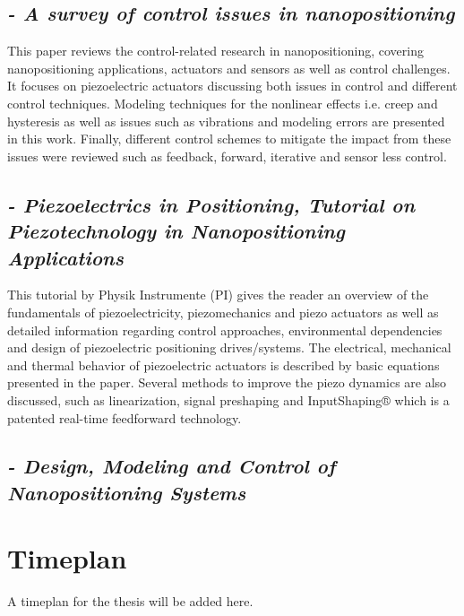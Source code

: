 \subsection*{\citep*{SurveyOfControlIssues:2007} {\small \emph{- A survey of control issues in nanopositioning}} }
This paper reviews the control-related research in nanopositioning, covering nanopositioning applications, actuators and sensors as well as control challenges. It focuses on piezoelectric actuators discussing both issues in control and different control techniques. Modeling techniques for the nonlinear effects i.e. creep and hysteresis as well as issues such as vibrations and modeling errors are presented in this work. Finally, different control schemes to mitigate the impact from these issues were reviewed such as feedback, forward, iterative and sensor less control.


\subsection*{\citep*{Piezo:2008} {\small \emph{- Piezoelectrics in Positioning, Tutorial on Piezotechnology in Nanopositioning Applications}} }
This tutorial by Physik Instrumente (PI) gives the reader an overview of the fundamentals of piezoelectricity, piezomechanics and piezo actuators as well as detailed information regarding control approaches, environmental dependencies and design of piezoelectric positioning drives/systems. The electrical, mechanical and thermal behavior of piezoelectric actuators is described by basic equations presented in the paper. Several methods to improve the piezo dynamics are also discussed, such as linearization, signal preshaping and InputShaping® which is a patented real-time feedforward technology.


\subsection*{\citep*{FlemingLeang:2014} {\small \emph{- Design, Modeling and Control of Nanopositioning Systems}} }

\section{Timeplan}
A timeplan for the thesis will be added here.
